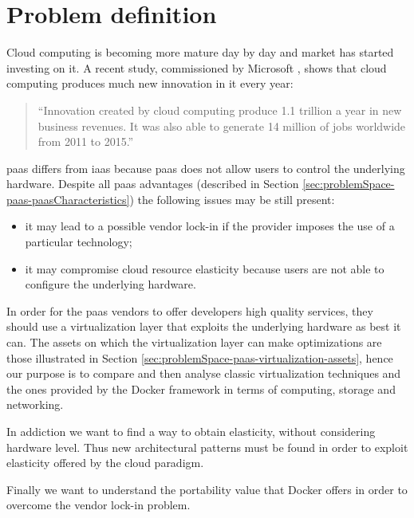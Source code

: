 %
%
\section{Problem definition}
\label{sec:problemSpace-problem}
Cloud computing is becoming more mature day by day and market has started investing on it. A recent
study, commissioned by Microsoft \cite{microsftCloudNewJob}, shows that cloud computing produces much
new innovation in \acs{it} every year:

\begin{center}
	\begin{quote}
		``Innovation created by cloud computing produce \textdollar{}1.1 trillion a year in new
		business revenues. It was also able to generate 14 million of jobs worldwide from 2011 to 2015.''
	\end{quote}
\end{center}

\ac{paas} differs from \ac{iaas} because \ac{paas} does not allow users to control the underlying
hardware. Despite all \ac{paas} advantages (described in Section \ref{sec:problemSpace-paas-paasCharacteristics})
the following issues may be still present:

\begin{itemize}
	\item{it may lead to a possible vendor lock-in if the provider imposes the use of a particular
		technology;}
	\item{it may compromise cloud resource elasticity because users are not able to configure the
		underlying hardware.}
\end{itemize}

In order for the \ac{paas} vendors to offer developers high quality services, they should use a 
virtualization layer that exploits the underlying hardware as best it can. The assets on which the
virtualization layer can make optimizations are those illustrated in Section
\ref{sec:problemSpace-paas-virtualization-assets}, hence our purpose is to compare and then analyse
classic virtualization techniques and the ones provided by the Docker framework in terms of computing,
storage and networking.

In addiction we want to find a way to obtain elasticity, without considering hardware level. Thus new
architectural patterns must be found in order to exploit elasticity offered by the cloud paradigm.

Finally we want to understand the portability value that Docker offers in order to overcome the vendor
lock-in problem.
